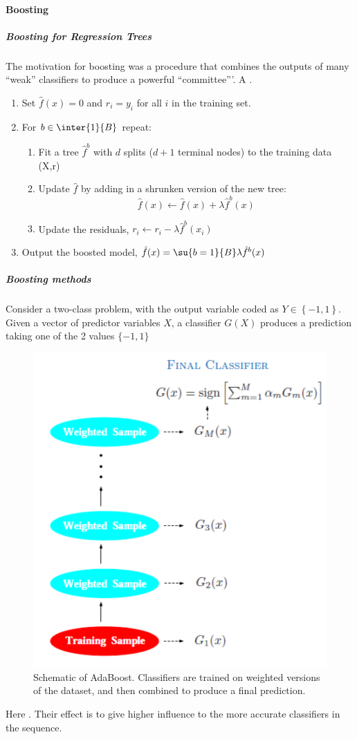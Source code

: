 \paragraph{Boosting}
\subparagraph{Boosting for Regression Trees}
The motivation for boosting was a procedure that combines the outputs of many ``weak'' classifiers
to produce a powerful ``committee'''. A .
\begin{enumerate}
	\item Set $\hat{f}(x)=0$ and $r_{i}=y_{i}$ for all $i$ in the
		training set.
	\item For $b\in\inter{1}{B}$ repeat:
		\begin{enumerate}[label=\alph*]
			\item Fit a tree $\hat{f}^{b}$ with $d$ splits
				($d+1$ terminal nodes) to the training
				data (X,r)
			\item Update $\hat{f}$ by adding in a shrunken
				version of the new tree:
				$$
				\hat{f}(x)\leftarrow \hat{f}(x)+\lambda
				\hat{f}^{b}(x)
				$$
			\item Update the residuals,
				$r_{i}\leftarrow r_{i}-\lambda \hat{f}^{b}(x_{i})$
			\end{enumerate}
	\item Output the boosted model, $\hat{f}(x)=\su{{b=1}}{B}\lambda\hat{f}^{b}(x)$
\end{enumerate}

\subparagraph{Boosting methods}
Consider a two-class problem, with the output variable coded as $Y\in\left\{-1,1\right\}$. Given a
vector of predictor variables $X$, a classifier $G(X)$ produces a prediction taking one of the 
2 values $\{-1,1\}$
\begin{figure}[H]
	\begin{center}
		\includegraphics[width=.5\textwidth]{./chap/1chap/7sec/images/1_adaboost.PNG}
	\end{center}
	\caption{Schematic of AdaBoost. Classifiers are trained on weighted versions of the 
	dataset, and then combined to produce a final prediction.}
	\label{fig:1_adaboost}
\end{figure}
\begin{center}
\end{center}
Here . Their effect is to give higher influence to the more accurate classifiers in
the sequence.

